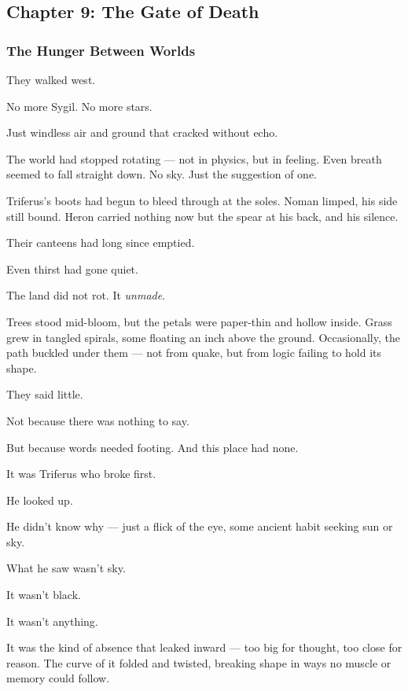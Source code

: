 \documentclass[12pt]{article}
\begin{document}
\newpage

\subsection{Chapter 9: The Gate of Death}

\vspace{.5in}

\subsubsection{The Hunger Between Worlds}

They walked west.

No more Sygil. No more stars.

Just windless air and ground that cracked without echo.

The world had stopped rotating — not in physics, but in feeling. Even breath seemed to fall straight down. No sky. Just the suggestion of one.

Triferus’s boots had begun to bleed through at the soles. Noman limped, his side still bound. Heron carried nothing now but the spear at his back, and his silence.

Their canteens had long since emptied.

Even thirst had gone quiet.

\bigskip

The land did not rot. It \textit{unmade}.

Trees stood mid-bloom, but the petals were paper-thin and hollow inside. Grass grew in tangled spirals, some floating an inch above the ground. Occasionally, the path buckled under them — not from quake, but from logic failing to hold its shape.

They said little.

Not because there was nothing to say.

But because words needed footing. And this place had none.

\bigskip

It was Triferus who broke first.

He looked up.

He didn’t know why — just a flick of the eye, some ancient habit seeking sun or sky.

What he saw wasn’t sky.

It wasn’t black.

It wasn’t anything.

It was the kind of absence that leaked inward — too big for thought, too close for reason. The curve of it folded and twisted, breaking shape in ways no muscle or memory could follow.
\end{document}
